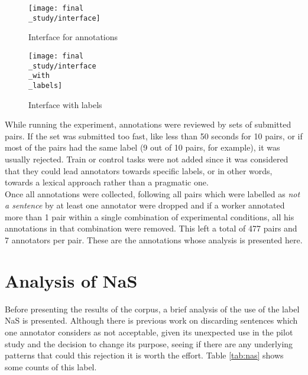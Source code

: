 \begin{figure}
\centering
\parbox{5cm}{\texttt{[image: final\\\_study/interface]}
\caption{Interface for annotations}\label{fig:int}}
\qquad
\begin{minipage}{5cm}
\texttt{[image: final\\\_study/interface\\\_with\\\_labels]}
\caption{Interface with labels}\label{fig:intlab}
\end{minipage}
\end{figure}

While running the experiment, annotations were reviewed by sets of submitted pairs. If the set was submitted too fast, like less than 50 seconds for 10 pairs, or if most of the pairs had the same label (9 out of 10 pairs, for example), it was usually rejected. Train or control tasks were not added since it was considered that they could lead annotators towards specific labels, or in other words, towards a lexical approach rather than a pragmatic one.\\

Once all annotations were collected, following \citet{pavlick2019inherent} all pairs which were labelled as \textit{not a sentence} by at least one annotator were dropped and if a worker annotated more than 1 pair within a single combination of experimental conditions, all his annotations in that combination were removed. This left a total of 477 pairs and 7 annotators per pair. These are the annotations whose analysis is presented here.\\

\section{Analysis of NaS}
\label{sect:nas}
Before presenting the results of the corpus, a brief analysis of the use of the label NaS is presented. Although there is previous work on discarding sentences which one annotator considers as not acceptable, given its unexpected use in the pilot study and the decision to change its purpose, seeing if there are any underlying patterns that could this rejection it is worth the effort. Table \ref{tab:nas} shows some counts of this label.\\ 


